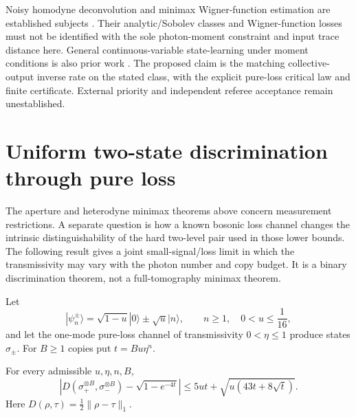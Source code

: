Noisy homodyne deconvolution and minimax Wigner-function estimation are
established subjects \cite{BGA2007,LMP2015}. Their analytic/Sobolev classes
and Wigner-function losses must not be identified with the sole photon-moment
constraint and input trace distance here. General continuous-variable
state-learning under moment conditions is also prior work \cite{Mele2025}.
The proposed claim is the matching collective-output inverse rate on the
stated class, with the explicit pure-loss critical law and finite certificate.
External priority and independent referee acceptance remain unestablished.

\section{Uniform two-state discrimination through pure loss}
\label{sec:pure-loss-discrimination}
The aperture and heterodyne minimax theorems above concern measurement
restrictions. A separate question is how a known bosonic loss channel changes
the intrinsic distinguishability of the hard two-level pair used in those
lower bounds. The following result gives a joint small-signal/loss limit in
which the transmissivity may vary with the photon number and copy budget.
It is a binary discrimination theorem, not a full-tomography minimax theorem.

Let
\[
 |\psi_n^\pm\rangle=\sqrt{1-u}|0\rangle\pm\sqrt u|n\rangle,
 \qquad n\ge1,\quad 0<u\le\frac1{16},
\]
and let the one-mode pure-loss channel of transmissivity
$0<\eta\le1$ produce states $\sigma_\pm$. For $B\ge1$ copies put
$t=Bu\eta^n$.

\begin{theorem}
\label{thm:pure-loss-uniform}
For every admissible $u,\eta,n,B$,
\[
\boxed{\left|
D(\sigma_+^{\otimes B},\sigma_-^{\otimes B})-
\sqrt{1-e^{-4t}}\right|
\le 5ut+\sqrt{u(43t+8\sqrt t)}.}
\tag{PL.1}\label{eq:pure-loss-bound}
\]
Here $D(\rho,\tau)=\tfrac12\|\rho-\tau\|_1$.
\end{theorem}

